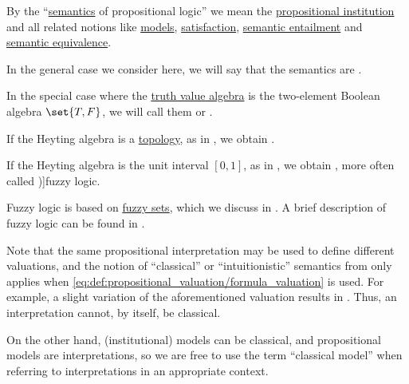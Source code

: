 \begin{definition}\label{def:propositional_semantics}\mimprovised
  By the \enquote{\hyperref[con:syntax_semantics_duality]{semantics} of propositional logic} we mean the \hyperref[def:propositional_institution]{propositional institution} and all related notions like \hyperref[def:institution/models]{models}, \hyperref[def:institution/satisfaction]{satisfaction}, \hyperref[def:institutional_entailment]{semantic entailment} and \hyperref[def:semantic_equivalence]{semantic equivalence}.

  \begin{thmenum}
     In the general case we consider here, we will say that the semantics are .

     In the special case where the \hyperref[con:truth_value_algebra]{truth value algebra} is the two-element Boolean algebra \( \set{ T, F } \), we will call them  or .

     If the Heyting algebra is a \hyperref[def:topological_space]{topology}, as in , we obtain .

     If the Heyting algebra is the unit interval \( [0, 1] \), as in , we obtain , more often called \term[en=fuzzy logic (\cite[17]{Rosen2019DiscreteMathematics})]{fuzzy logic}.
  \end{thmenum}
\end{definition}
\begin{comments}
  \item Fuzzy logic is based on \hyperref[def:fuzzy_set]{fuzzy sets}, which we discuss in . A brief description of fuzzy logic can be found in \cite[17]{Rosen2019DiscreteMathematics}.
\end{comments}

\begin{remark}\label{rem:classical_propositional_interpretations}
  Note that the same propositional interpretation may be used to define different valuations, and the notion of \enquote{classical} or \enquote{intuitionistic} semantics from  only applies when \eqref{eq:def:propositional_valuation/formula_valuation} is used. For example, a slight variation of the aforementioned valuation results in . Thus, an interpretation cannot, by itself, be classical.

  On the other hand, (institutional) models can be classical, and propositional models are interpretations, so we are free to use the term \enquote{classical model} when referring to interpretations in an appropriate context.
\end{remark}


